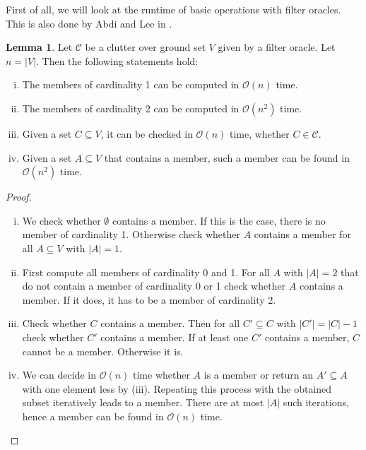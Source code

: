 \documentclass[a4paper, 12pt, twoside=false]{scrbook}
\theoremstyle{definition}
\newtheorem{lemma}[theorem]{Lemma}
\begin{document}
   First of all, we will look at the runtime of basic operations with filter oracles. This is also done by Abdi and Lee in \cite{deltas}.

   \begin{lemma}\label{computations}
       Let $\mathcal{C}$ be a clutter over ground set $V$ given by a filter oracle.
       Let $n=|V|$.
       Then the following statements hold:
       \begin{enumerate}[(i)]
           \item The members of cardinality 1 can be computed in $\mathcal{O}(n)$ time.
           \item The members of cardinality 2 can be computed in $\mathcal{O}(n^2)$ time.
           \item Given a set $C \subseteq V$, it can be checked in $\mathcal{O}(n)$ time, whether $C \in \mathcal{C}$.
           \item Given a set $A \subseteq V$ that contains a member, such a member can be found in $\mathcal{O}(n^2)$ time.
       \end{enumerate}
   \end{lemma}
   \begin{proof}
       \leavevmode
       \begin{enumerate}[(i)]
           \item We check whether $\emptyset$ contains a member. If this is the case, there is no member of cardinality 1. Otherwise check whether $A$ contains a member for all $A \subseteq V$ with $|A|=1$.
           \item First compute all members of cardinality 0 and 1. For all $A$ with $|A|=2$ that do not contain a member of cardinality 0 or 1 check whether $A$ contains a member. If it does, it has to be a member of cardinality 2.
           \item Check whether $C$ contains a member. Then for all $C' \subseteq C$ with $|C'|=|C|-1$ check whether $C'$ contains a member. If at least one $C'$ contains a member, $C$ cannot be a member. Otherwise it is.
           \item We can decide in $\mathcal{O}(n)$ time whether $A$ is a member or return an $A' \subseteq A$ with one element less by (iii). Repeating this process with the obtained subset iteratively leads to a member. There are at most $|A|$ such iterations, hence a member can be found in $\mathcal{O}(n)$ time.
       \end{enumerate}

   \end{proof}
\end{document}
